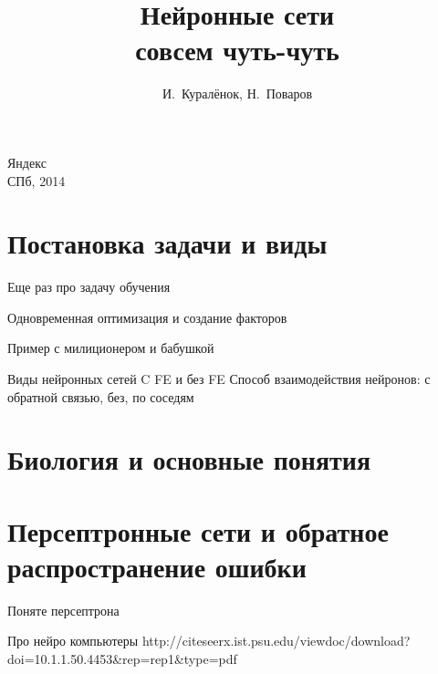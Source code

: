 \documentclass[14pt, fleqn, xcolor={dvipsnames, table}]{beamer}
\title{Нейронные сети\\\small{совсем чуть-чуть}}
\author[]{\small{%
И.~Куралёнок,
Н.~Поваров}}
\date{}
\begin{document}
\begin{frame}
\maketitle
\small
\begin{center}
\vspace{-60pt}
\normalsize {\color{red}Я}ндекс \\
\vspace{80pt}
\footnotesize СПб, 2014
\end{center}
\end{frame}
\section{Постановка задачи и виды} %

\begin{frame}{Еще раз про задачу обучения}
\end{frame}

\begin{frame}{Одновременная оптимизация и создание факторов}
\end{frame}

\begin{frame}{Пример с милиционером и бабушкой}
\end{frame}

\begin{frame}{Виды нейронных сетей}
C FE и без FE
Способ взаимодействия нейронов: с обратной связью, без, по соседям

\end{frame}

\section{Биология и основные понятия} %
\section{Персептронные сети и обратное распространение ошибки} %
\begin{frame}{Поняте персептрона}
\end{frame}

\begin{frame}{Про нейро компьютеры}
http://citeseerx.ist.psu.edu/viewdoc/download?doi=10.1.1.50.4453&rep=rep1&type=pdf
\end{frame}
\end{document}
